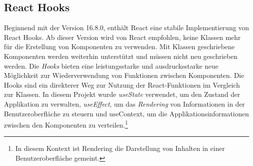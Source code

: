\subsection{React Hooks}
Beginnend mit der Version 16.8.0, enthält React eine stabile Implementierung von React Hooks. Ab dieser Version wird von React empfohlen, keine Klassen mehr für die Erstellung von Komponenten zu verwenden\cite{R01}. Mit Klassen geschriebene Komponenten werden weiterhin unterstützt und müssen nicht neu geschrieben werden{\cite{R05}}. Die \textit{Hooks} bieten eine leistungsstarke und ausdrucksstarke neue Möglichkeit zur Wiederverwendung von Funktionen zwischen Komponenten. Die Hooks sind ein direkterer Weg zur Nutzung der React-Funktionen im Vergleich zur Klassen. In diesem Projekt wurde \textit{useState} verwendet, um den Zustand der Applikation zu verwalten, \textit{useEffect}, um das \textit{Rendering} von Informationen in der Benutzeroberfläche zu steuern und useContext, um die Applikationsinformationen zwischen den Komponenten zu verteilen.\footnote{In diesem Kontext ist Rendering die Darstellung von Inhalten in einer Benutzeroberfläche gemeint.}

